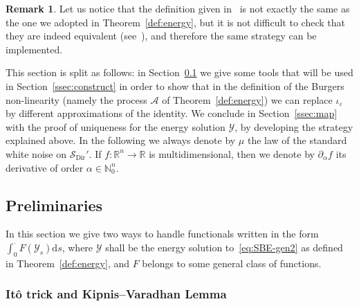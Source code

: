 \documentclass[10pt]{amsart}
\theoremstyle{definition}\newtheorem{defi}[theo]{Definition}\newtheorem{rema}[theo]{Remark}\newtheorem{exam}[theo]{Example}\newtheorem{exem}[theo]{Example}\newtheorem{nota}[theo]{Notation}
\DeclareMathOperator{\Dir}{Dir}
\newcommand{\bb}[1]{{\mathbb #1}}
\newcommand{\mc}[1]{{\mathcal #1}}
\renewcommand{\mc}[1]{{\mathcal #1}}
\newcommand{\SD}{\ensuremath{\mc S_{\Dir}}}
\newcommand*{\dd}{\mathrm{d}}
\newcommand*{\ds}{\dd s}
\begin{document}
\begin{rema}
Let us notice that the definition given in~\cite{Gubinelli2015Energy} is not exactly the same as the one we adopted in Theorem~\ref{def:energy}, but it is not difficult to check that they are indeed equivalent (see~\cite[Proposition~4]{GJSi}), and therefore the same strategy can be implemented.
\end{rema}


This section is split as follows: in Section~\ref{ssec:preli} we give some tools that will be used in Section~\ref{ssec:construct} in order to show that in the definition of the Burgers non-linearity (namely the process $\mc A$ of Theorem~\ref{def:energy}) we can replace $\iota_\varepsilon$ by different approximations of the identity. We conclude in Section~\ref{ssec:map} with the proof of uniqueness for the energy solution $\mc Y$, by developing the strategy explained above. In the following we always denote by $\mu$ the law of the standard white noise on $\SD'$. If $f\colon\bb R^n\to\bb R$ is multidimensional, then we denote by $\partial_\alpha f$ its derivative of order $\alpha \in \bb N_0^n$.



\subsection{Preliminaries} \label{ssec:preli}
In this section we give two ways to handle functionals written in the form\linebreak $\int_0^\cdot F(\mc Y_s)\ds$, where $\mc Y$ shall be the energy solution to~\eqref{eq:SBE-gen2} as defined in Theorem~\ref{def:energy}, and $F$ belongs to some general class of functions.

\subsubsection{It\^o trick and Kipnis--Varadhan Lemma}
\end{document}
